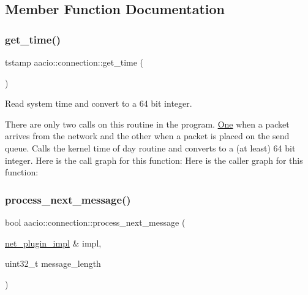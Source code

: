 \subsection{Member Function Documentation}
\mbox{\label{classaacio_1_1connection_a4005241f51784d4b5f3de4b0fb57d31e}} 
\subsubsection{\texorpdfstring{get\+\_\+time()}{get\_time()}}
{\footnotesize\ttfamily tstamp aacio\+::connection\+::get\+\_\+time (\begin{DoxyParamCaption}{ }\end{DoxyParamCaption})\hspace{0.3cm}{\ttfamily [inline]}}



Read system time and convert to a 64 bit integer. 

There are only two calls on this routine in the program. \mbox{\hyperlink{struct_one}{One}} when a packet arrives from the network and the other when a packet is placed on the send queue. Calls the kernel time of day routine and converts to a (at least) 64 bit integer. Here is the call graph for this function\+:
Here is the caller graph for this function\+:
\mbox{\label{classaacio_1_1connection_afe0bbf6f9135632ae62870c6c3582f86}} 
\subsubsection{\texorpdfstring{process\+\_\+next\+\_\+message()}{process\_next\_message()}}
{\footnotesize\ttfamily bool aacio\+::connection\+::process\+\_\+next\+\_\+message (\begin{DoxyParamCaption}\item[{\mbox{\hyperlink{classaacio_1_1net__plugin__impl}{net\+\_\+plugin\+\_\+impl}} \&}]{impl,  }\item[{uint32\+\_\+t}]{message\+\_\+length }\end{DoxyParamCaption})}



